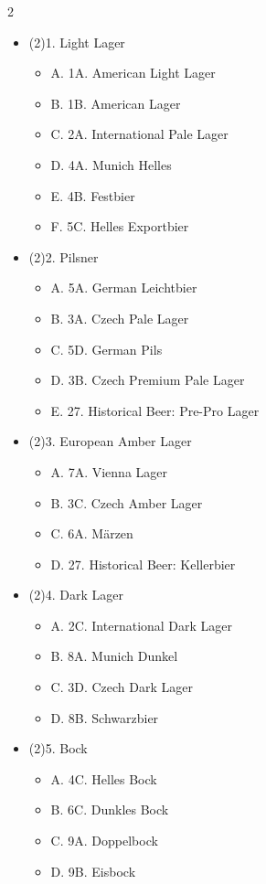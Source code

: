 \begin{multicols*}{2}
\begin{itemize}[noitemsep]
\item[] (2)1. Light Lager
\begin{itemize}
  \item[] A. 1A. American Light Lager
  \item[] B. 1B. American Lager
  \item[] C. 2A. International Pale Lager
  \item[] D. 4A. Munich Helles
  \item[] E. 4B. Festbier
  \item[] F. 5C. Helles Exportbier
\end{itemize}
\item[] (2)2. Pilsner
\begin{itemize}
  \item[] A. 5A. German Leichtbier
  \item[] B. 3A. Czech Pale Lager
  \item[] C. 5D. German Pils
  \item[] D. 3B. Czech Premium Pale Lager
  \item[] E. 27. Historical Beer: Pre-Pro Lager
\end{itemize}
\item[] (2)3. European Amber Lager
\begin{itemize}
  \item[] A. 7A. Vienna Lager
  \item[] B. 3C. Czech Amber Lager
  \item[] C. 6A. Märzen
  \item[] D. 27. Historical Beer: Kellerbier
\end{itemize}
\item[] (2)4. Dark Lager
\begin{itemize}
  \item[] A. 2C. International Dark Lager
  \item[] B. 8A. Munich Dunkel
  \item[] C. 3D. Czech Dark Lager
  \item[] D. 8B. Schwarzbier
\end{itemize}
\item[] (2)5. Bock
\begin{itemize}
  \item[] A. 4C. Helles Bock
  \item[] B. 6C. Dunkles Bock
  \item[] C. 9A. Doppelbock
  \item[] D. 9B. Eisbock
\end{itemize}

\end{itemize}
\end{multicols*}
